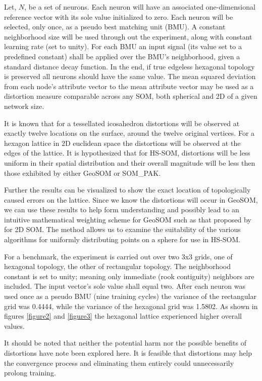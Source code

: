 \documentclass[12pt]{article}
\begin{document}
Let, \begin{math}N\end{math}, be a set of neurons.  Each neuron will have an
associated one-dimensional reference vector with its sole value initialized to
zero. Each neuron will be selected, only once, as a pseudo best matching unit
(BMU).  A constant neighborhood size will be used through out the experiment,
along with constant learning rate (set to unity).  For each BMU an input
signal (its value set to a predefined constant) shall be applied over the
BMU's neighborhood, given a standard distance decay function.  In the end,
if true edgeless hexagonal topology is preserved all neurons should have the
same value. The mean squared deviation from each node's attribute vector to
the mean attribute vector may be used as a distortion measure comparable
across any SOM, both spherical and 2D of a given network size.

It is known that for a tessellated icosahedron distortions
will be observed at exactly twelve locations on the surface, around the twelve
original vertices.  For a hexagon lattice in 2D euclidean space the
distortions will be observed at the edges of the lattice.  It is hypothesized
that for HS-SOM, distortions will be less uniform in their spatial
distribution and their overall magnitude will be less then those exhibited by
either GeoSOM or SOM\_PAK.

Further the results can be visualized to show the exact location of
topologically caused errors on the lattice.  Since we know the distortions
will occur in GeoSOM, we can use these results to help form understanding and
possibly lead to an intuitive mathematical weighting scheme for GeoSOM such as
that proposed by \cite{Kohonen2000} for 2D SOM. The method allows us to
examine the suitability of the various algorithms for uniformly distributing
points on a sphere for use in HS-SOM.

For a benchmark, the experiment is carried out over two 3x3 grids, one of
hexagonal topology, the other of rectangular topology. The neighborhood
constant is set to unity; meaning only immediate (rook contiguity) neighbors
are included. The input vector's sole value shall equal two. After each
neuron was used once as a pseudo BMU (nine training cycles) the variance of
the rectangular grid was 0.4444, while the variance of the hexagonal grid was
1.5802. As shown in figures \ref{figure2} and \ref{figure3} the hexagonal lattice
experienced higher overall values.

It should be noted that neither the potential harm nor the possible benefits
of distortions have note been explored here.  It is feasible that distortions
may help the convergence process and eliminating them entirely could
unnecessarily prolong training.
\end{document}
